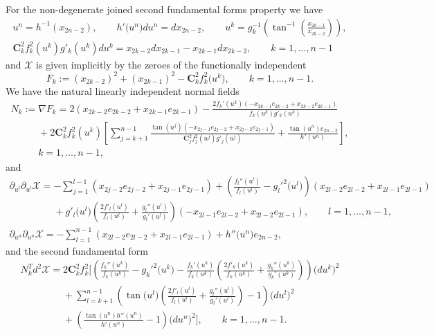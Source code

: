 For the non-degenerate joined second fundamental forms property we
have
\begin{gather*}
u^n=h^{-1}(x_{2n-2}),\qquad h'\big(u^n\big)du^n=dx_{2n-2},\qquad
u^k=g_k^{-1}\left(\tan^{-1}\left(\frac{x_{2k-1}}{x_{2k-2}}\right)\right),
\\
\mathbf{C}_k^2f_k^2(u^k)g'_k(u^k)du^k=x_{2k-2}dx_{2k-1}-x_{2k-1}dx_{2k-2},
\qquad k=1,\dots ,n-1
\end{gather*}
and $\mathcal{X}$ is given implicitly by the zeroes of the
functionally independent
\[
F_k:=(x_{2k-2})^2+(x_{2k-1})^2-\mathbf{C}_k^2f_k^2\big(u^k\big),\qquad
k=1,\dots ,n-1.
\]
We have the natural linearly independent normal f\/ields
\begin{gather*}
N_k:=\nabla F_k=2(x_{2k-2}e_{2k-2}+x_{2k-1}e_{2k-1})
-\frac{2f_k'(u^k)(-x_{2k-1}e_{2k-2}+x_{2k-2}e_{2k-1})}{f_k(u^k)g'_k(u^k)}
\\
\phantom{N_k:=}{} +2\mathbf{C}_k^2f_k^2(u^k)\left[\sum_{j=k+1}^{n-1}\frac{\tan(u^j)
(-x_{2j-1}e_{2j-2}+x_{2j-2}e_{2j-1})}
{\mathbf{C}_j^2f_j^2(u^j)g'_j(u^j)}+\frac{\tan(u^n)e_{2n-2}}{h'(u^n)}\right],\\
\phantom{N_k:=}{} k=1,\dots ,n-1,
\end{gather*} and
\begin{gather*}
\partial_{u^l}\partial_{u^l}\mathcal{X}=-\sum_{j=1}^{l-1}(x_{2j-2}e_{2j-2}+x_{2j-1}e_{2j-1})
+\left(\frac{f_l''(u^l)}{f_l(u^l)}-g_l'^2\big(u^l\big)\right)(x_{2l-2}e_{2l-2}+x_{2l-1}e_{2l-1})
\\
\phantom{\partial_{u^l}\partial_{u^l}\mathcal{X}=}{} +g'_l\big(u^l\big)\left(\frac{2f'_l(u^l)}{f_l(u^l)}+\frac{g_l''(u^l)}{g_l'(u^l)}\right)
(-x_{2l-1}e_{2l-2}+x_{2l-2}e_{2l-1}),\qquad l=1,\dots ,n-1,
\\
\partial_{u^n}\partial_{u^n}\mathcal{X}=-\sum_{l=1}^{n-1}(x_{2l-2}e_{2l-2}+x_{2l-1}e_{2l-1})
+h''\big(u^n\big)e_{2n-2},
\end{gather*}
and the second fundamental form
\begin{gather*}
N_k^Td^2\mathcal{X}=2\mathbf{C}_k^2f_k^2\Bigg[\left(\frac{f_k''(u^k)}{f_k(u^k)}-g_k'^2\big(u^k\big)
-\frac{f_k'(u^k)}{f_k(u^k)}\left(\frac{2f'_k(u^k)}{f_k(u^k)}+
\frac{g_k''(u^k)}{g_k'(u^k)}\right)\right)\big(du^k\big)^2
\\
\phantom{N_k^Td^2\mathcal{X}=}{}
+\sum_{l=k+1}^{n-1}\left(\tan\big(u^l\big)\left(\frac{2f'_l(u^l)}{f_l(u^l)}
+\frac{g_l''(u^l)}{g_l'(u^l)}\right)-1\right)\big(du^l\big)^2\\
\phantom{N_k^Td^2\mathcal{X}=}{}
+\left(\frac{\tan(u^n)h''(u^n)}{h'(u^n)}-1\right)\big(du^n\big)^2\Bigg],\qquad k=1,\dots ,n-1.
\end{gather*}

